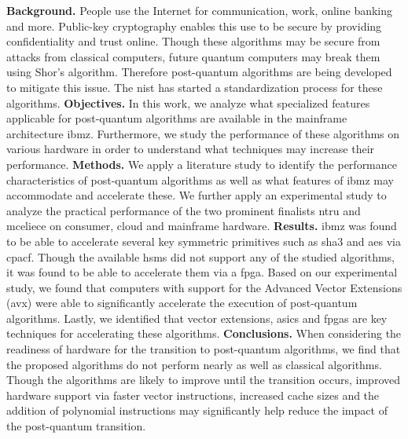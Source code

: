 \abstract
\noindent\textbf{Background.} People use the Internet for communication, work, online banking and more. Public-key cryptography enables this use to be secure by providing confidentiality and trust online. Though these algorithms may be secure from attacks from classical computers, future quantum computers may break them using Shor's algorithm. Therefore \gls{post-quantum} algorithms are being developed to mitigate this issue. The \acrlong{nist} has started a standardization process for these algorithms.\newline
\textbf{Objectives.} In this work, we analyze what specialized features applicable for \gls{post-quantum} algorithms are available in the mainframe architecture \gls{ibmz}. Furthermore, we study the performance of these algorithms on various hardware in order to understand what techniques may increase their performance.\newline
\textbf{Methods.} We apply a literature study to identify the performance characteristics of \gls{post-quantum} algorithms as well as what features of \gls{ibmz} may accommodate and accelerate these. We further apply an experimental study to analyze the practical performance of the two prominent finalists \gls{ntru} and \gls{mceliece} on consumer, cloud and mainframe hardware.\newline
\textbf{Results.} \gls{ibmz} was found to be able to accelerate several key symmetric primitives such as \gls{sha3} and \gls{aes} via \gls{cpacf}. Though the available \acrlong{hsm}s did not support any of the studied algorithms, it was found to be able to accelerate them via a \gls{fpga}. Based on our experimental study, we found that computers with support for the Advanced Vector Extensions (\gls{avx}) were able to significantly accelerate the execution of \gls{post-quantum} algorithms. Lastly, we identified that vector extensions, \glspl{asic} and \glspl{fpga} are key techniques for accelerating these algorithms.\newline
\textbf{Conclusions.} When considering the readiness of hardware for the transition to \gls{post-quantum} algorithms, we find that the proposed algorithms do not perform nearly as well as classical algorithms. Though the algorithms are likely to improve until the transition occurs, improved hardware support via faster vector instructions, increased cache sizes and the addition of polynomial instructions may significantly help reduce the impact of the \gls{post-quantum} transition.

